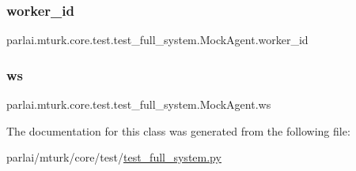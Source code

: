 \subsubsection{\texorpdfstring{worker\+\_\+id}{worker\_id}}
{\footnotesize\ttfamily parlai.\+mturk.\+core.\+test.\+test\+\_\+full\+\_\+system.\+Mock\+Agent.\+worker\+\_\+id}

\mbox{\label{classparlai_1_1mturk_1_1core_1_1test_1_1test__full__system_1_1MockAgent_a2870f5b01b6d901d44d2dae99ff6a263}} 
\subsubsection{\texorpdfstring{ws}{ws}}
{\footnotesize\ttfamily parlai.\+mturk.\+core.\+test.\+test\+\_\+full\+\_\+system.\+Mock\+Agent.\+ws}



The documentation for this class was generated from the following file\+:\begin{DoxyCompactItemize}
\item 
parlai/mturk/core/test/\hyperlink{test_2test__full__system_8py}{test\+\_\+full\+\_\+system.\+py}\end{DoxyCompactItemize}
